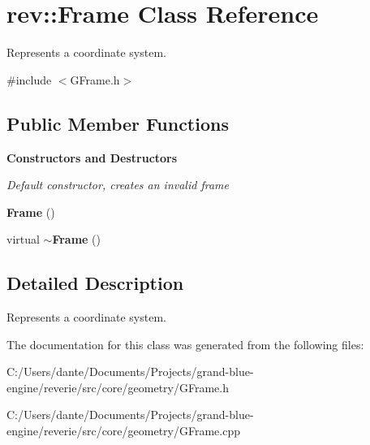 \hypertarget{classrev_1_1_frame}{}\section{rev\+::Frame Class Reference}
\label{classrev_1_1_frame}


Represents a coordinate system.  




{\ttfamily \#include $<$G\+Frame.\+h$>$}

\subsection*{Public Member Functions}
\begin{Indent}\textbf{ Constructors and Destructors}\par
{\em Default constructor, creates an invalid frame }\begin{DoxyCompactItemize}
\item 
\mbox{\label{classrev_1_1_frame_af4df6366b34d5bb0cad6a05c0b968fb0}} 
{\bfseries Frame} ()
\item 
\mbox{\label{classrev_1_1_frame_a3c13c50241ae093c6efba57aa1c33500}} 
virtual {\bfseries $\sim$\+Frame} ()
\end{DoxyCompactItemize}
\end{Indent}


\subsection{Detailed Description}
Represents a coordinate system. 

The documentation for this class was generated from the following files\+:\begin{DoxyCompactItemize}
\item 
C\+:/\+Users/dante/\+Documents/\+Projects/grand-\/blue-\/engine/reverie/src/core/geometry/G\+Frame.\+h\item 
C\+:/\+Users/dante/\+Documents/\+Projects/grand-\/blue-\/engine/reverie/src/core/geometry/G\+Frame.\+cpp\end{DoxyCompactItemize}
